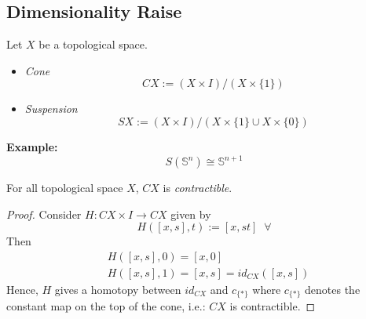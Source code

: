 \subsection{Dimensionality Raise}

\begin{definition}
    Let $X$ be a topological space.
    \begin{itemize}
        \item \textit{Cone}
        $$CX:= (X \times I) / (X \times \{1\})$$
        \item \textit{Suspension}
        $$SX:= (X \times I) / (X \times \{1\} \cup X \times \{0\})$$
    \end{itemize}
\end{definition}

\noindent\textbf{Example:} $$S(\mathbb{S}^n) \cong \mathbb{S}^{n+1}$$

\begin{proposition}
    For all topological space $X$, $CX$ is \textit{contractible}.
\end{proposition}

\begin{proof}
    Consider $H: CX \times I \to CX$ given by
    $$H([x,s],t) := [x,st]\;\;\forall $$
    Then 
    \begin{align*}
        &H([x,s],0) =[x,0] 
        \\&H([x,s],1) = [x,s] = id_{CX}([x,s])
    \end{align*}
    Hence, $H$ gives a homotopy between $id_{CX}$ and $c_{\{*\}}$ where $c_{\{*\}}$ denotes the constant map on the top of the cone, i.e.: $CX$ is contractible.
\end{proof}

